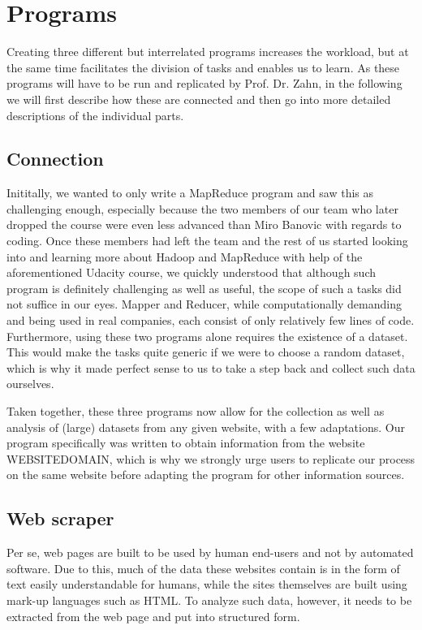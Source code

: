 \documentclass[a4paper, 12pt]{article}
\begin{document}
\section{Programs}
Creating three different but interrelated programs increases the workload, but at the same time facilitates the division of tasks and enables us to learn. As these programs will have to be run and replicated by Prof. Dr. Zahn, in the following we will first describe how these are connected and then go into more detailed descriptions of the individual parts. 

\subsection{Connection}
Inititally, we wanted to only write a MapReduce program and saw this as challenging enough, especially because the two members of our team who later dropped the course were even less advanced than Miro Banovic with regards to coding. Once these members had left the team and the rest of us started looking into and learning more about Hadoop and MapReduce with help of the aforementioned Udacity course, we quickly understood that although such program is definitely challenging as well as useful, the scope of such a tasks did not suffice in our eyes. Mapper and Reducer, while computationally demanding and being used in real companies, each consist of only relatively few lines of code. Furthermore, using these two programs alone requires the existence of a dataset. This would make the tasks quite generic if we were to choose a random dataset, which is why it made perfect sense to us to take a step back and collect such data ourselves. 

Taken together, these three programs now allow for the collection as well as analysis of (large) datasets from any given website, with a few adaptations. Our program specifically was written to obtain information from the website WEBSITEDOMAIN, which is why we strongly urge users to replicate our process on the same website before adapting the program for other information sources.

\subsection{Web scraper}
Per se, web pages are built to be used by human end-users and not by automated software. Due to this, much of the data these websites contain is in the form of text easily understandable for humans, while the sites themselves are built using mark-up languages such as HTML. To analyze such data, however, it needs to be extracted from the web page and put into structured form. 
\end{document}
